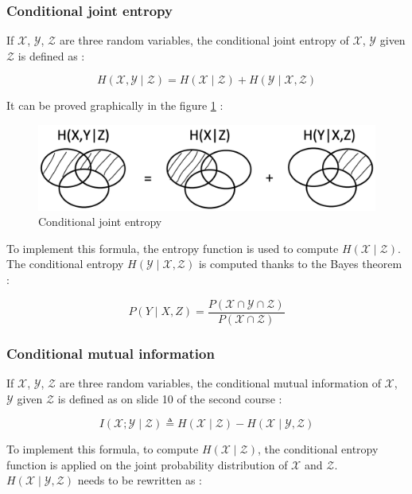 \documentclass[titlepage]{article}
\begin{document}
\subsubsection*{Conditional joint entropy}

If $\mathcal{X}$, $\mathcal{Y}$, $\mathcal{Z}$ are three random variables, the conditional joint entropy of $\mathcal{X}$, $\mathcal{Y}$ given $\mathcal{Z}$ is defined as : 

$$H(\mathcal{X}, \mathcal{Y} \mid \mathcal{Z})=H(\mathcal{X} \mid \mathcal{Z})+H(\mathcal{Y} \mid \mathcal{X}, \mathcal{Z})$$

It can be proved graphically in the figure \ref{fig:condjoint} : 

\begin{figure}[H]
    \centering
    \includegraphics[scale = 0.28]{condjoint.png}
    \caption{Conditional joint entropy}
    \label{fig:condjoint}
\end{figure}

To implement this formula, the entropy function is used to compute $H(\mathcal{X} \mid \mathcal{Z})$. The conditional entropy $H(\mathcal{Y} \mid \mathcal{X}, \mathcal{Z})$ is computed thanks to the Bayes theorem : 

$$P(Y \mid X,Z) = \frac{P(\mathcal{X} \cap \mathcal{Y} \cap \mathcal{Z})}{P(\mathcal{X} \cap \mathcal{Z})}$$
 
\subsubsection*{Conditional mutual information}

If $\mathcal{X}$, $\mathcal{Y}$, $\mathcal{Z}$ are three random variables, the conditional mutual information of $\mathcal{X}$, $\mathcal{Y}$ given $\mathcal{Z}$ is defined as on slide 10 of the second course :  

$$ I(\mathcal{X} ; \mathcal{Y} \mid \mathcal{Z}) \triangleq H(\mathcal{X} \mid \mathcal{Z})-H(\mathcal{X} \mid \mathcal{Y}, \mathcal{Z})$$

To implement this formula, to compute $H(\mathcal{X} \mid \mathcal{Z})$, the conditional entropy function is applied on the joint probability distribution of $\mathcal{X}$ and $\mathcal{Z}$. $H(\mathcal{X} \mid \mathcal{Y}, \mathcal{Z})$ needs to be rewritten as : 
\end{document}
